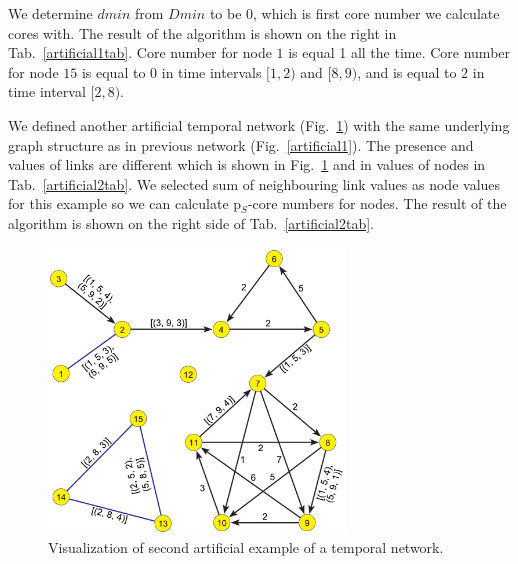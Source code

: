 \documentclass[a4paper,twoside,10pt]{article}
\begin{document}
We determine $dmin$ from $Dmin$ to be $0$, which is first core number we calculate cores  with. The result of the algorithm is shown on the right in Tab.~\ref{artificial1tab}. Core number for node $1$ is equal 1 all the time. Core number for node $15$ is equal to $0$ in time intervals $[1,2)$ and $[8,9)$, and is equal to $2$ in time interval $[2,8)$.

We defined another artificial temporal network (Fig.~\ref{artificial2}) with the same underlying graph structure as in previous network (Fig.~\ref{artificial1}). The presence and values of links are different which is shown in Fig.~\ref{artificial2} and in values of nodes in Tab.~\ref{artificial2tab}. We selected sum of neighbouring link values as node values for this example so we can calculate p$_S$-core numbers for nodes. The result of the algorithm is shown on the right side of Tab.~\ref{artificial2tab}.

\begin{figure}[!h]
	\centering
	\includegraphics[width=0.7\textwidth]{./pics/connWeight.pdf}
  \caption{Visualization of second artificial example of a temporal network.}
  \label{artificial2}
\end{figure}
\end{document}
